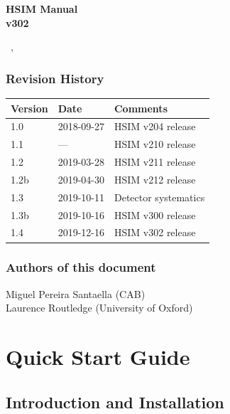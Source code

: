 \documentclass[12pt]{report}
\def\mydate{\leavevmode\hbox{\the\day~\monthname, \the\year}}
\begin{document}
\begin{titlepage}

\vspace*{4cm}
\begin{center}

{\selectfont
\Huge
\textbf{
HSIM Manual\\[0.5ex]
\Large
v302}
\vspace{2cm}

\large
\mydate
}
\end{center}
\vspace*{\fill}


\end{titlepage}

\tableofcontents

\vfill
\subsection*{Revision History}

\begin{table}[h]
\label{tab:revision}
\begin{tabular}{lll}
\hline
Version & Date & Comments \\
\hline
1.0 & 2018-09-27 & HSIM v204 release \\
1.1 & --- & HSIM v210 release \\
1.2 & 2019-03-28 & HSIM v211 release \\
1.2b & 2019-04-30 & HSIM v212 release \\
1.3 & 2019-10-11 & Detector systematics \\
1.3b & 2019-10-16 & HSIM v300 release \\
1.4 & 2019-12-16 & HSIM v302 release \\
\hline
\end{tabular}
\end{table}


\subsection*{Authors of this document}
Miguel Pereira Santaella (CAB) \\
Laurence Routledge (University of Oxford)

\clearpage

\chapter{Quick Start Guide}

\section{Introduction and Installation}
\end{document}
